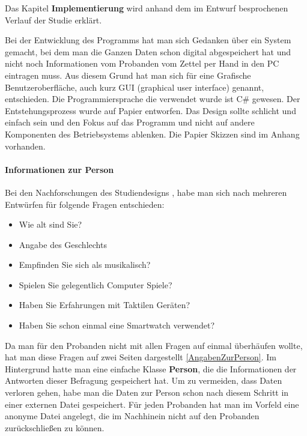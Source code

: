 
Das Kapitel \textbf{Implementierung} wird anhand dem im Entwurf besprochenen Verlauf der Studie erkl{\"a}rt.

Bei der Entwicklung des Programms hat man sich Gedanken {\"u}ber ein System gemacht, bei dem man die Ganzen Daten schon digital abgespeichert hat und nicht noch Informationen vom Probanden vom Zettel per Hand in den PC eintragen muss. Aus diesem Grund hat man sich f{\"u}r eine Grafische Benutzeroberfl{\"a}che, auch kurz GUI (graphical user interface) genannt, entschieden. 
Die Programmiersprache die verwendet wurde ist C\# gewesen.
Der Entstehungsprozess wurde auf Papier entworfen. Das Design sollte schlicht und einfach sein und den Fokus auf das Programm und nicht auf andere Komponenten des Betriebsystems ablenken. Die Papier Skizzen sind im Anhang vorhanden.

\paragraph{Informationen zur Person}
Bei den Nachforschungen des Studiendesigns \cite{benyon2005designing}, habe man sich nach mehreren Entw{\"u}rfen f{\"u}r folgende Fragen entschieden:

\begin{itemize}
\item Wie alt sind Sie?
\item Angabe des Geschlechts
\item Empfinden Sie sich als musikalisch? 
\item Spielen Sie gelegentlich Computer Spiele?
\item Haben Sie Erfahrungen mit Taktilen Ger{\"a}ten?
\item Haben Sie schon einmal eine Smartwatch verwendet?
\end{itemize}

Da man f{\"u}r den Probanden nicht mit allen Fragen auf einmal {\"u}berh{\"a}ufen wollte, hat man diese Fragen auf zwei Seiten dargestellt \autoref{AngabenZurPerson}. Im Hintergrund hatte man eine einfache Klasse \textbf{Person}, die die Informationen der Antworten dieser Befragung gespeichert hat. Um zu vermeiden, dass Daten verloren gehen, habe man die Daten zur Person schon nach diesem Schritt in einer externen Datei gespeichert. F{\"u}r jeden Probanden hat man im Vorfeld eine anonyme Datei angelegt, die im Nachhinein nicht auf den Probanden zur{\"u}ckschlie{\ss}en zu k{\"o}nnen.  

